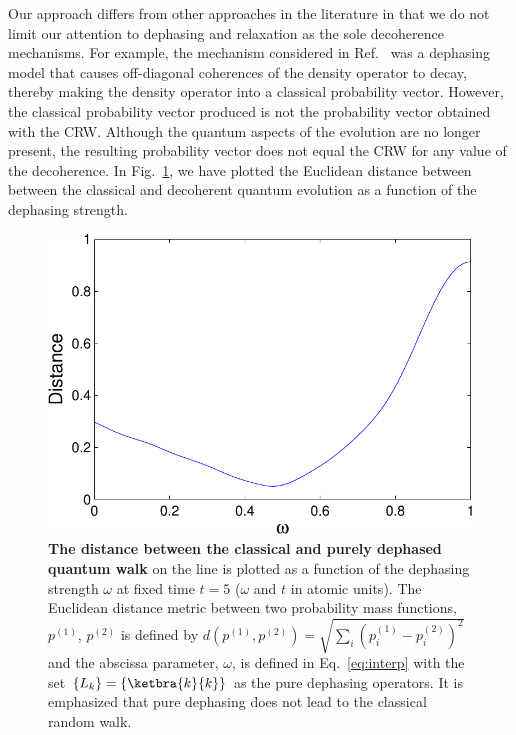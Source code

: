 \documentclass[11pt,oneside,final]{huthesis}%
\begin{document}
Our approach differs from other approaches in the literature in that we do not limit our attention to dephasing and relaxation as the sole decoherence mechanisms. For example, the mechanism considered in Ref.~\cite{Kendon07} was a dephasing model that causes off-diagonal coherences of the density operator to decay, thereby making the density operator into a classical probability vector.  However, the classical probability vector produced is not the probability vector obtained with the CRW.  Although the quantum aspects of the evolution are no longer present, the resulting probability vector does not equal the CRW for any value of the decoherence.  In Fig.~\ref{fig:dist}, we have plotted the Euclidean distance between between the classical and decoherent quantum evolution as a function of the dephasing strength.  


\begin{figure}[t]
	\begin{center}
\includegraphics{./figures/dist.pdf}
	\end{center}
	\caption{\textbf{The distance between the classical and purely dephased quantum walk} on the line is plotted as a function of the dephasing strength $\omega$ at fixed time $t=5$ ($\omega$ and $t$ in atomic units). The Euclidean distance metric between two probability mass functions, $p^{(1)}$, $p^{(2)}$ is defined by $d(p^{(1)},p^{(2)})=\sqrt{\sum_i (p^{(1)}_i-p^{(2)}_i)^2}$ and the abscissa parameter, $\omega$, is defined in Eq.~\eqref{eq:interp} with the set $\{L_k\}=\{\ketbra{k}{k}\}$ as the pure dephasing operators.  It is emphasized that pure dephasing does not lead to the classical random walk.  }
	\label{fig:dist}
\end{figure}
\end{document}
